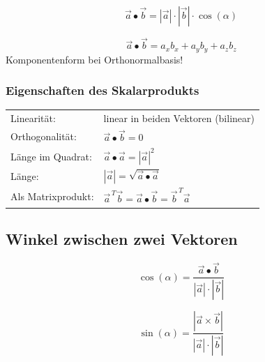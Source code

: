 \begin{minipage}[t]{0.4\columnwidth}
	\begin{center}
		\textbf{}
		\[
		\vec{a} \bullet \vec{b}
		= |\vec{a}| \cdot |\vec{b}| \cdot \cos(\alpha)
		\]
	\end{center}
\end{minipage}
\hfill
\begin{minipage}[t]{0.58\columnwidth}
	\begin{center}
		\textbf{}
		\[
		\vec{a} \bullet \vec{b}
		=
		a_x b_x + a_y b_y + a_z b_z
		\]
		Komponentenform bei Orthonormalbasis!
	\end{center}
\end{minipage}

\subsubsection{Eigenschaften des Skalarprodukts}

\renewcommand{\arraystretch}{1.3}
\begin{tabular}{ll}
	Linearität:
	& linear in beiden Vektoren (bilinear) \\

	Orthogonalität:
	& $\vec{a} \bullet \vec{b} = 0$ \\

	Länge im Quadrat:
	& $\vec{a} \bullet \vec{a} = |\vec{a}|^2$ \\

	Länge:
	& $|\vec{a}| = \sqrt{\vec{a} \bullet \vec{a}}$ \\

	Als Matrixprodukt:
	& $\vec{a}^{\,T}\vec{b}
	= \vec{a} \bullet \vec{b}
	= \vec{b}^{\,T}\vec{a}$
\end{tabular}
\renewcommand{\arraystretch}{1}


\subsection{Winkel zwischen zwei Vektoren}

\vspace{0.2cm}
\begin{minipage}[t]{0.50\columnwidth}
	\begin{center}
		\textbf{}
		\[
		\cos(\alpha)
		=
		\frac{\vec{a}\bullet\vec{b}}
		{|\vec{a}|\cdot|\vec{b}|}
		\]
	\end{center}
\end{minipage}
\hfill
\begin{minipage}[t]{0.5\columnwidth}
	\begin{center}
		\textbf{}
		\[
		\sin(\alpha)
		=
		\frac{|\vec{a}\times\vec{b}|}
		{|\vec{a}|\cdot|\vec{b}|}
		\]
	\end{center}
\end{minipage}

